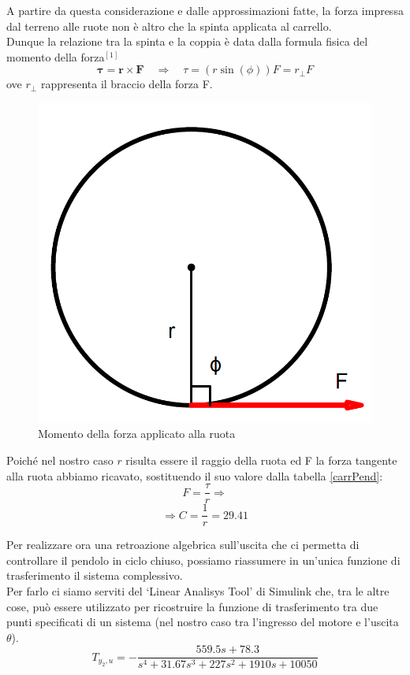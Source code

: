 A partire da questa considerazione e dalle approssimazioni fatte, la forza impressa dal terreno alle ruote non è altro che la spinta applicata al carrello.\\
Dunque la relazione tra la spinta e la coppia è data dalla formula fisica del momento della forza$^{[1]}$
\begin{equation*}
 \boldsymbol{\tau}=\boldsymbol{r}\times \boldsymbol{F}\quad\Rightarrow\quad \tau=(r\sin(\phi))F=r_{\bot}F
\end{equation*}
ove $r_{\bot}$ rappresenta il braccio della forza F.
\begin{figure}[ht]
	\centering
	\includegraphics[scale=0.3]{braccioForza.PNG}
	\caption{Momento della forza applicato alla ruota}
	\label{braccioForza}
\end{figure}
Poiché nel nostro caso $r$ risulta essere il raggio della ruota ed F la forza tangente alla ruota abbiamo ricavato, sostituendo il suo valore dalla tabella \ref{carrPend}: $$F=\displaystyle\frac{\tau}{r}\Rightarrow$$$$\Rightarrow C=\displaystyle\frac{1}{r}=29.41$$

Per realizzare ora una retroazione algebrica sull'uscita che ci permetta di controllare il pendolo in ciclo chiuso, possiamo riassumere in un'unica funzione di trasferimento il sistema complessivo.\\
Per farlo ci siamo serviti del `Linear Analisys Tool' di Simulink che, tra le altre cose, può essere utilizzato per ricostruire la funzione di trasferimento tra due punti specificati di un sistema (nel nostro caso tra l'ingresso del motore e l'uscita $\theta$).
$$T_{y_2,u}=-\displaystyle\frac{559.5s+78.3}{s^4+31.67s^3+227s^2+1910s+10050}$$

